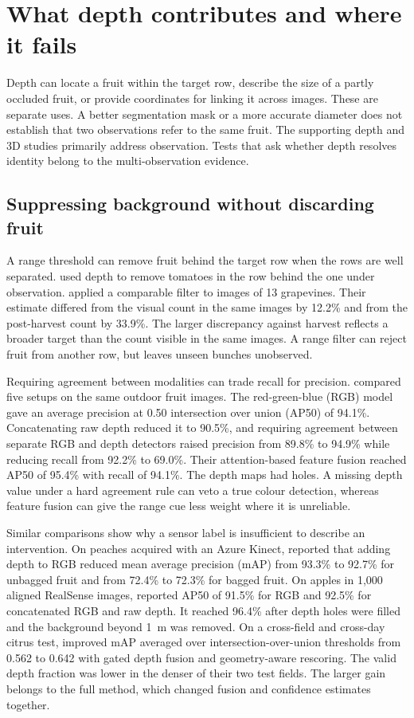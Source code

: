 \section{What depth contributes and where it fails}\label{sec:depth}

Depth can locate a fruit within the target row, describe the size of a partly occluded fruit, or provide coordinates for linking it across images. These are separate uses. A better segmentation mask or a more accurate diameter does not establish that two observations refer to the same fruit. The \nDepth supporting depth and 3D studies primarily address observation. Tests that ask whether depth resolves identity belong to the multi-observation evidence.

\subsection{Suppressing background without discarding fruit}

A range threshold can remove fruit behind the target row when the rows are well separated. \citet{afonso2020tomato} used depth to remove tomatoes in the row behind the one under observation. \citet{devanna2025yield} applied a comparable filter to images of 13 grapevines. Their estimate differed from the visual count in the same images by 12.2\% and from the post-harvest count by 33.9\%. The larger discrepancy against harvest reflects a broader target than the count visible in the same images. A range filter can reject fruit from another row, but leaves unseen bunches unobserved.

Requiring agreement between modalities can trade recall for precision. \citet{sun2022noise} compared five setups on the same outdoor fruit images. The red-green-blue (RGB) model gave an average precision at 0.50 intersection over union (AP50) of 94.1\%. Concatenating raw depth reduced it to 90.5\%, and requiring agreement between separate RGB and depth detectors raised precision from 89.8\% to 94.9\% while reducing recall from 92.2\% to 69.0\%. Their attention-based feature fusion reached AP50 of 95.4\% with recall of 94.1\%. The depth maps had holes. A missing depth value under a hard agreement rule can veto a true colour detection, whereas feature fusion can give the range cue less weight where it is unreliable.

Similar comparisons show why a sensor label is insufficient to describe an intervention. On peaches acquired with an Azure Kinect, \citet{luo2022multi} reported that adding depth to RGB reduced mean average precision (mAP) from 93.3\% to 92.7\% for unbagged fruit and from 72.4\% to 72.3\% for bagged fruit. On apples in 1{,}000 aligned RealSense images, \citet{kaukab2024improving} reported AP50 of 91.5\% for RGB and 92.5\% for concatenated RGB and raw depth. It reached 96.4\% after depth holes were filled and the background beyond 1~m was removed. On a cross-field and cross-day citrus test, \citet{liu2026geosphere} improved mAP averaged over intersection-over-union thresholds from 0.562 to 0.642 with gated depth fusion and geometry-aware rescoring. The valid depth fraction was lower in the denser of their two test fields. The larger gain belongs to the full method, which changed fusion and confidence estimates together.

